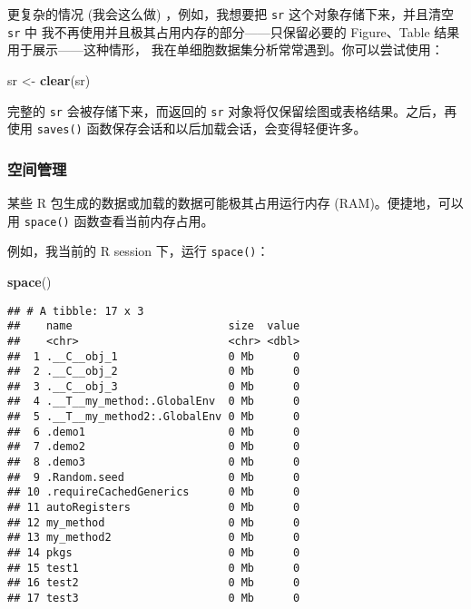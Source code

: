 \documentclass[
]{article}
\newenvironment{Shaded}{\begin{snugshade}}{\end{snugshade}}
\newcommand{\KeywordTok}[1]{\textcolor[rgb]{0.13,0.29,0.53}{\textbf{#1}}}
\newcommand{\NormalTok}[1]{#1}
\newcommand{\StringTok}[1]{\textcolor[rgb]{0.31,0.60,0.02}{#1}}
\begin{document}
更复杂的情况 (我会这么做) ，例如，我想要把 \texttt{sr} 这个对象存储下来，并且清空 \texttt{sr} 中
我不再使用并且极其占用内存的部分------只保留必要的 Figure、Table 结果用于展示------这种情形，
我在单细胞数据集分析常常遇到。你可以尝试使用：

\begin{Shaded}
\begin{Highlighting}[]
\NormalTok{sr \textless{}{-}}\StringTok{ }\KeywordTok{clear}\NormalTok{(sr)}
\end{Highlighting}
\end{Shaded}

完整的 \texttt{sr} 会被存储下来，而返回的 \texttt{sr} 对象将仅保留绘图或表格结果。之后，再使用
\texttt{saves()} 函数保存会话和以后加载会话，会变得轻便许多。

\hypertarget{ux7a7aux95f4ux7ba1ux7406}{%
\subsubsection{空间管理}\label{ux7a7aux95f4ux7ba1ux7406}}

某些 R 包生成的数据或加载的数据可能极其占用运行内存 (RAM)。便捷地，可以用 \texttt{space()} 函数查看当前内存占用。

例如，我当前的 R session 下，运行 \texttt{space()}：

\begin{Shaded}
\begin{Highlighting}[]
\KeywordTok{space}\NormalTok{()}
\end{Highlighting}
\end{Shaded}

\begin{verbatim}
## # A tibble: 17 x 3
##    name                        size  value
##    <chr>                       <chr> <dbl>
##  1 .__C__obj_1                 0 Mb      0
##  2 .__C__obj_2                 0 Mb      0
##  3 .__C__obj_3                 0 Mb      0
##  4 .__T__my_method:.GlobalEnv  0 Mb      0
##  5 .__T__my_method2:.GlobalEnv 0 Mb      0
##  6 .demo1                      0 Mb      0
##  7 .demo2                      0 Mb      0
##  8 .demo3                      0 Mb      0
##  9 .Random.seed                0 Mb      0
## 10 .requireCachedGenerics      0 Mb      0
## 11 autoRegisters               0 Mb      0
## 12 my_method                   0 Mb      0
## 13 my_method2                  0 Mb      0
## 14 pkgs                        0 Mb      0
## 15 test1                       0 Mb      0
## 16 test2                       0 Mb      0
## 17 test3                       0 Mb      0
\end{verbatim}
\end{document}
